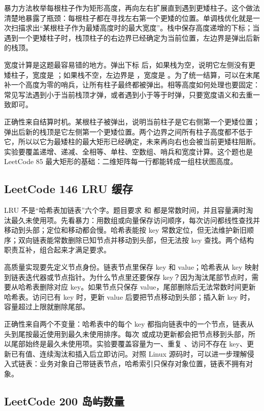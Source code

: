 暴力方法枚举每根柱子作为矩形高度，再向左右扩展直到遇到更矮柱子。这个做法清楚地暴露了瓶颈：每根柱子都在寻找左右第一个更矮的位置。单调栈优化就是一次扫描求出“某根柱子作为最矮高度时的最大宽度”。栈中保存高度递增的下标；当遇到一个更矮柱子时，栈顶柱子的右边界已经确定为当前位置，左边界是弹出后新的栈顶。

宽度计算是这题最容易错的地方。弹出下标  后，如果栈为空，说明它左侧没有更矮柱子，宽度是 ；如果栈不空，左边界是 ，宽度是 。为了统一结算，可以在末尾补一个高度为零的哨兵，让所有柱子最终都被弹出。相等高度如何处理也要固定：常见写法遇到小于当前栈顶才弹，或者遇到小于等于时弹，只要宽度语义和去重一致即可。

正确性来自结算时机。某根柱子被弹出，说明当前柱子是它右侧第一个更矮位置；弹出后新的栈顶是它左侧第一个更矮位置。两个边界之间所有柱子高度都不低于它，所以以它为最矮柱的最大矩形已经确定，未来再向右也会被当前更矮柱阻断。实验要覆盖递增、递减、全相等、单柱、空数组、哨兵和宽度计算。这个题也是 LeetCode 85 最大矩形的基础：二维矩阵每一行都能转成一组柱状图高度。

\subsection{LeetCode 146 LRU 缓存}

LRU 不是“哈希表加链表”六个字。题目要求  和  都是常数时间，并且容量满时淘汰最久未使用项。先看暴力：用数组或向量保存访问顺序，每次访问都线性查找并移动到头部；定位和移动都会慢。哈希表能按 key 常数定位，但无法维护新旧顺序；双向链表能常数删除已知节点并移动到头部，但无法按 key 查找。两个结构职责互补，组合起来才满足要求。

高质量实现要先定义节点身份。链表节点里保存 key 和 value；哈希表从 key 映射到链表迭代器或节点指针。为什么节点里还要保存 key？因为淘汰尾部节点时，需要从哈希表删除对应 key。如果节点只保存 value，尾部删除后无法常数时间更新哈希表。访问已有 key 时，更新 value 后要把节点移动到头部；插入新 key 时，容量超过上限就删除尾部。

正确性来自两个不变量：哈希表中的每个 key 都指向链表中的一个节点，链表从头到尾按最近使用到最久未使用排序。每次  或成功更新都会把节点移到头部，所以尾部始终是最久未使用项。实验要覆盖容量为一、重复 、访问不存在 key、更新已有值、连续淘汰和插入后立即访问。对照 Linux 源码时，可以进一步理解侵入式链表：业务对象自己带链表节点，哈希索引只保存对象位置，链表不拥有对象。

\subsection{LeetCode 200 岛屿数量}

